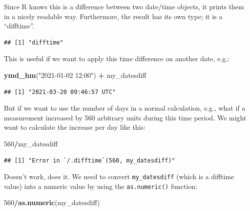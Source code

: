 \documentclass[
  12pt,
  krantz2]{krantz}
\makeatletter
\newenvironment{Shaded}{\begin{snugshade}}{\end{snugshade}}
\newcommand{\DecValTok}[1]{\textcolor[rgb]{0.00,0.00,0.81}{#1}}
\newcommand{\KeywordTok}[1]{\textcolor[rgb]{0.13,0.29,0.53}{\textbf{#1}}}
\newcommand{\NormalTok}[1]{#1}
\newcommand{\OperatorTok}[1]{\textcolor[rgb]{0.81,0.36,0.00}{\textbf{#1}}}
\newcommand{\StringTok}[1]{\textcolor[rgb]{0.31,0.60,0.02}{#1}}
\newenvironment{kframe}{%
\medskip{}
\setlength{\fboxsep}{.8em}
 \def\at@end@of@kframe{}%
 \ifinner\ifhmode%
  \def\at@end@of@kframe{\end{minipage}}%
  \begin{minipage}{\columnwidth}%
 \fi\fi%
 \def\FrameCommand##1{\hskip\@totalleftmargin \hskip-\fboxsep
 \colorbox{shadecolor}{##1}\hskip-\fboxsep
     \hskip-\linewidth \hskip-\@totalleftmargin \hskip\columnwidth}%
 \MakeFramed {\advance\hsize-\width
   \@totalleftmargin\z@ \linewidth\hsize
   \@setminipage}}%
 {\par\unskip\endMakeFramed%
 \at@end@of@kframe}
\renewenvironment{Shaded}{\begin{kframe}}{\end{kframe}}
\makeatother
\begin{document}
Since R knows this is a difference between two date/time objects, it prints them in a nicely readable way.
Furthermore, the result has its own type; it is a ``difftime''.

\begin{Shaded}
\end{Shaded}

\begin{verbatim}
## [1] "difftime"
\end{verbatim}

This is useful if we want to apply this time difference on another date, e.g.:

\begin{Shaded}
\begin{Highlighting}[]
\KeywordTok{ymd_hm}\NormalTok{(}\StringTok{"2021-01-02 12:00"}\NormalTok{) }\OperatorTok{+}\StringTok{ }\NormalTok{my_datesdiff}
\end{Highlighting}
\end{Shaded}

\begin{verbatim}
## [1] "2021-03-20 09:46:57 UTC"
\end{verbatim}

But if we want to use the number of days in a normal calculation, e.g., what if a measurement increased by 560 arbitrary units during this time period.
We might want to calculate the increase per day like this:

\begin{Shaded}
\begin{Highlighting}[]
\DecValTok{560}\OperatorTok{/}\NormalTok{my_datesdiff}
\end{Highlighting}
\end{Shaded}

\begin{verbatim}
## [1] "Error in `/.difftime`(560, my_datesdiff)"
\end{verbatim}

Doesn't work, does it.
We need to convert \texttt{my\_datesdiff} (which is a difftime value) into a numeric value by using the \texttt{as.numeric()} function:

\begin{Shaded}
\begin{Highlighting}[]
\DecValTok{560}\OperatorTok{/}\KeywordTok{as.numeric}\NormalTok{(my_datesdiff)}
\end{Highlighting}
\end{Shaded}
\end{document}
